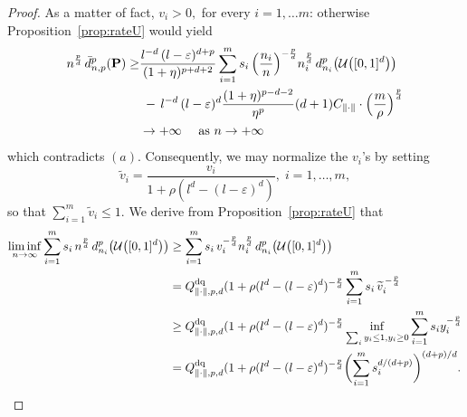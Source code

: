 \begin{proof}
As a matter of fact, $v_i>0,$ for every $i=1,\ldots  m$: otherwise
Proposition~\ref{prop:rateU} would yield
\begin{equation*}
\begin{split}
n^{\frac pd}\, \bar d^p_{n,p}(\mathbf{P})  \geq& \frac{l^{-d}\,(l-\varepsilon)^{d+p}}{(1+\eta)^{p+d+2}}
\sum_{i=1}^m s_i\, \Bigl(\frac{n_i}{n}\Bigr)^{-\frac pd} n_i^{\frac pd}\,
d^p_{n_i}\bigl(\mathcal{U}\bigl([0,1]^d\bigr)\bigr)\\
& \;-\,  l^{-d}\,(l-\varepsilon)^d
  \frac{(1+\eta)^{p-d-2}}{\eta^p} (d+1) C_{\lVert\cdot\rVert}\cdot
  \Bigl(\frac{m}{\rho}\Bigr)^{\frac pd}\\
  & \to +\infty \quad \mbox{ as } n\to +\infty
  \end{split}
\end{equation*}
which contradicts $(a)$. Consequently, we may normalize the $v_i$'s by setting
\[
	\widetilde v_i = \frac{v_i}{1+\rho (l^d - (l-\varepsilon)^d)}, \; i=1,\ldots,m,
\]
so that $\sum_{i=1}^m \widetilde v_i \leq 1$. We derive from 
Proposition~\ref{prop:rateU} that
\begin{equation*}
\begin{split}
  \liminf_{n\to\infty} \sum_{i=1}^m s_i\, n^{\frac pd}\,
  d^p_{n_i}\bigl(\mathcal{U}\bigl([0,1]^d\bigr)\bigr) 
  &\ge\sum_{i=1}^m s_i\,v_i^{-\frac pd}   n_i^{\frac pd}\,
  d^p_{n_i}\bigl(\mathcal{U}\bigl([0,1]^d\bigr)\bigr) \\ 
  & = Q^{\text{dq}}_{\lVert\cdot\rVert, p, d} (1+\rho (l^d - (l-\varepsilon)^d)^{-\frac pd}\sum_{i=1}^m s_i\, \widetilde v_i^{\,-\frac pd}\\
 &\geq Q^{\text{dq}}_{\lVert\cdot\rVert, p, d}(1+\rho (l^d - (l-\varepsilon)^d)^{-\frac pd}\inf_{\sum_i y_i\le 1, y_i\ge 0} \sum_{i=1}^m s_i y_i^{-\frac pd}
\\
 &= Q^{\text{dq}}_{\lVert\cdot\rVert, p, d}(1+\rho (l^d - (l-\varepsilon)^d)^{-\frac pd} \biggl(\sum_{i=1}^m s_i^{d/(d+p)} \biggr)^{(d+p)/d}.
  \end{split}
\end{equation*}
 


\end{proof}
